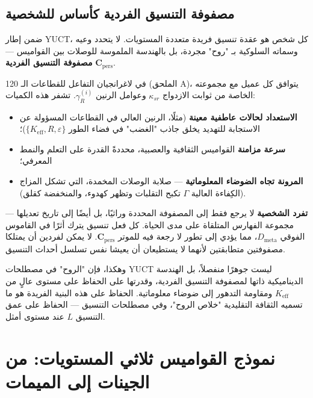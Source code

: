 \documentclass[12pt,a4paper]{article}
\begin{document}
	\subsection{مصفوفة التنسيق الفردية كأساس للشخصية}
	\label{subsec:personality-matrix}
	
	ضمن إطار YUCT، كل شخص هو عقدة تنسيق فريدة متعددة المستويات. لا يتحدد وعيه وسماته السلوكية بـ "روح" مجردة، بل بالهندسة الملموسة للوصلات بين القواميس — \textbf{مصفوفة التنسيق الفردية} \(\mathbf{C}_{\text{pers}}\).
	
	في لاغرانجيان التفاعل للقطاعات الـ 120 (الملحق A)، يتوافق كل عميل مع مجموعته الخاصة من ثوابت الازدواج \(\kappa_{sr}\) وعوامل الرنين \(\gamma_{R}^{(i)}\). تشفر هذه الكميات:
	\begin{itemize}
		\item \textbf{الاستعداد لحالات عاطفية معينة} (مثلًا، الرنين العالي في القطاعات المسؤولة عن الاستجابة للتهديد يخلق جاذب "الغضب" في فضاء الطور \(\{K_{\mathrm{eff}}, R, \varepsilon\}\))؛
		\item \textbf{سرعة مزامنة} القواميس الثقافية والعصبية، محددةً القدرة على التعلم والنمط المعرفي؛
		\item \textbf{المرونة تجاه الضوضاء المعلوماتية} — صلابة الوصلات المخمدة، التي تشكل المزاج (الكِفاءة العالية \(\Gamma\) تكبح التقلبات وتظهر كهدوء، والمنخفضة كقلق).
	\end{itemize}
	
	\textbf{تفرد الشخصية} لا يرجع فقط إلى المصفوفة المحددة وراثيًا، بل أيضًا إلى تاريخ تعديلها — مجموعة الفهارس المتلقاة على مدى الحياة. كل فعل تنسيق يترك أثرًا في القاموس الفوقي \(D_{\text{meta}}\)، مما يؤدي إلى تطور لا رجعة فيه للموتر \(\mathbf{C}_{\text{pers}}\). لا يمكن لفردين أن يمتلكا مصفوفتين متطابقتين لأنهما لا يستطيعان أن يعيشا نفس تسلسل أحداث التنسيق.
	
	وهكذا، فإن "الروح" في مصطلحات YUCT ليست جوهرًا منفصلاً، بل الهندسة الديناميكية ذاتها لمصفوفة التنسيق الفردية، وقدرتها على الحفاظ على مستوى عالٍ من \(K_{\mathrm{eff}}\) ومقاومة التدهور إلى ضوضاء معلوماتية. الحفاظ على هذه البنية الفريدة هو ما تسميه الثقافة التقليدية "خلاص الروح"، وفي مصطلحات التنسيق — الحفاظ على عمق التنسيق \(L\) عند مستوى أمثل.
	
	\section{نموذج القواميس ثلاثي المستويات: من الجينات إلى الميمات}
	
\end{document}
